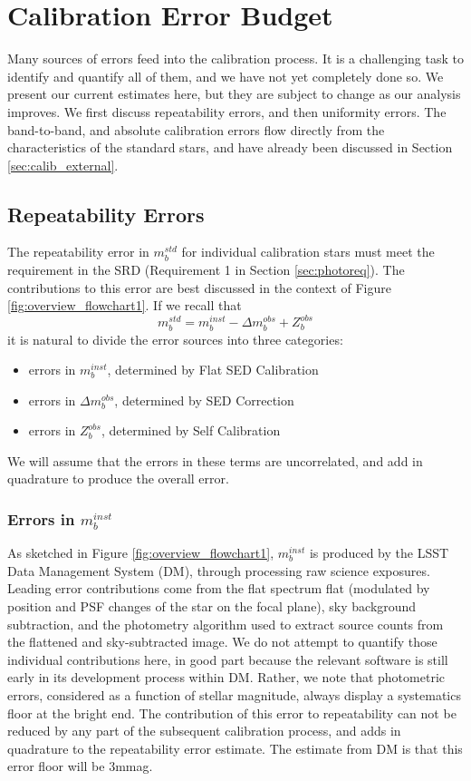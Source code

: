 \documentclass[12pt,preprint]{aastex}
\begin{document}
\section{Calibration Error Budget}
\label{sec:error_budget}
Many sources of errors feed into the calibration process.  It is a challenging task to identify and quantify all of them, and we have not yet completely done so.  We present our current estimates here, but they are subject to change as our analysis improves. We first
discuss repeatability errors, and then uniformity errors.   The band-to-band, and absolute calibration errors flow directly from the characteristics of the standard stars, and have already been discussed in Section \ref{sec:calib_external}.
\subsection{Repeatability Errors}
\label{sec:rpterrs}
The repeatability error in $m_b^{std}$ for individual calibration stars must meet the requirement in the SRD (Requirement 1 in Section \ref{sec:photoreq}).  The contributions to this error are best discussed in the context of Figure \ref{fig:overview_flowchart1}.  If we recall that
\begin{equation}
m_b^{std} = m_b^{inst} - \Delta m_b^{obs} + Z_b^{obs}
\end{equation}
it is natural to divide the error sources into three categories:

\begin{itemize}
\item{errors in $m_b^{inst}$, determined by Flat SED Calibration}
\item{errors in $\Delta m_b^{obs}$, determined by SED Correction}
\item{errors in $Z_b^{obs}$, determined by Self Calibration}
\end{itemize}

We will assume that the errors in these terms are uncorrelated, and add in quadrature to produce the overall error.

\subsubsection{Errors in $m_b^{inst}$}
As sketched in Figure \ref{fig:overview_flowchart1}, $m_b^{inst}$ is produced by the LSST Data Management System (DM), through processing raw science exposures. Leading error contributions come from the flat spectrum flat (modulated by position and PSF
changes of the star on the focal plane), sky background subtraction, and the photometry algorithm used to extract source counts from the flattened and sky-subtracted image. We do not attempt to quantify those individual contributions here, in good part because the relevant software is still early in its development process within DM. Rather, we note that photometric errors, considered as a function of stellar magnitude, always display a systematics floor at the bright end. The contribution of this error to repeatability can not be reduced by any part of the subsequent calibration process, and adds in quadrature to the repeatability error estimate. The estimate from DM is that this error floor will be 3mmag. 
\end{document}
